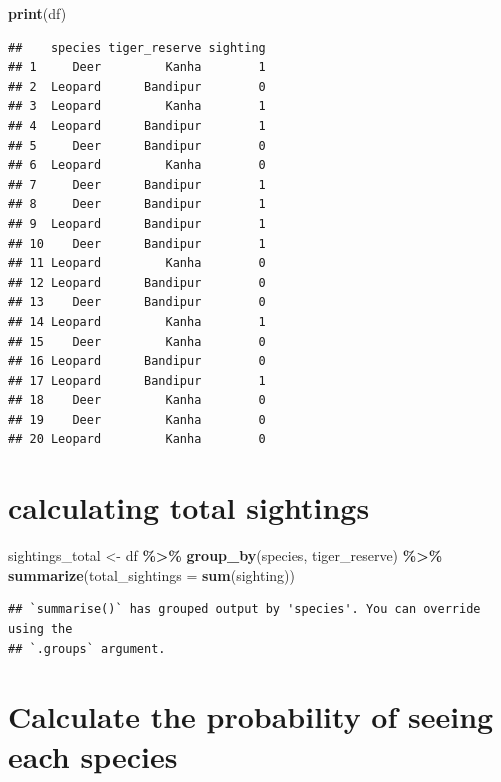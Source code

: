 \documentclass[
]{book}
\newenvironment{Shaded}{\begin{snugshade}}{\end{snugshade}}
\newcommand{\AttributeTok}[1]{\textcolor[rgb]{0.13,0.29,0.53}{#1}}
\newcommand{\FunctionTok}[1]{\textcolor[rgb]{0.13,0.29,0.53}{\textbf{#1}}}
\newcommand{\NormalTok}[1]{#1}
\newcommand{\OtherTok}[1]{\textcolor[rgb]{0.56,0.35,0.01}{#1}}
\newcommand{\SpecialCharTok}[1]{\textcolor[rgb]{0.81,0.36,0.00}{\textbf{#1}}}
\begin{document}
\begin{Shaded}
\begin{Highlighting}[]
\FunctionTok{print}\NormalTok{(df)}
\end{Highlighting}
\end{Shaded}

\begin{verbatim}
##    species tiger_reserve sighting
## 1     Deer         Kanha        1
## 2  Leopard      Bandipur        0
## 3  Leopard         Kanha        1
## 4  Leopard      Bandipur        1
## 5     Deer      Bandipur        0
## 6  Leopard         Kanha        0
## 7     Deer      Bandipur        1
## 8     Deer      Bandipur        1
## 9  Leopard      Bandipur        1
## 10    Deer      Bandipur        1
## 11 Leopard         Kanha        0
## 12 Leopard      Bandipur        0
## 13    Deer      Bandipur        0
## 14 Leopard         Kanha        1
## 15    Deer         Kanha        0
## 16 Leopard      Bandipur        0
## 17 Leopard      Bandipur        1
## 18    Deer         Kanha        0
## 19    Deer         Kanha        0
## 20 Leopard         Kanha        0
\end{verbatim}

\hypertarget{calculating-total-sightings}{%
\section{calculating total sightings}\label{calculating-total-sightings}}

\begin{Shaded}
\begin{Highlighting}[]
\NormalTok{sightings\_total }\OtherTok{\textless{}{-}}\NormalTok{ df }\SpecialCharTok{\%\textgreater{}\%}
  \FunctionTok{group\_by}\NormalTok{(species, tiger\_reserve) }\SpecialCharTok{\%\textgreater{}\%}
  \FunctionTok{summarize}\NormalTok{(}\AttributeTok{total\_sightings =} \FunctionTok{sum}\NormalTok{(sighting))}
\end{Highlighting}
\end{Shaded}

\begin{verbatim}
## `summarise()` has grouped output by 'species'. You can override using the
## `.groups` argument.
\end{verbatim}

\hypertarget{calculate-the-probability-of-seeing-each-species}{%
\section{Calculate the probability of seeing each species}\label{calculate-the-probability-of-seeing-each-species}}
\end{document}
